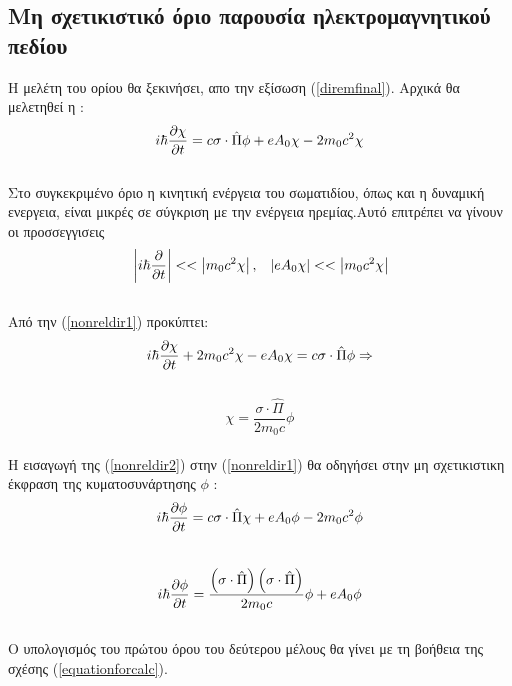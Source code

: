 \subsection{Mη σχετικιστικό όριο παρουσία ηλεκτρομαγνητικού πεδίου}
Η μελέτη του ορίου θα ξεκινήσει, απο την εξίσωση (\ref{diremfinal}). Αρχικά θα μελετηθεί η :\\ 
\begin{equation}
  i\hbar \frac{\partial \chi}{\partial t} = c \sigma \cdot \hat{\Pi} \phi+ e A_0\chi -2m_0 c^2 \chi
  \label{nonreldir1}
\end{equation}\\
Στο συγκεκριμένο όριο η κινητική ενέργεια του σωματιδίου, όπως και η δυναμική ενεργεια, είναι μικρές σε σύγκριση με την ενέργεια ηρεμίας.Αυτό επιτρέπει να γίνουν οι προσσεγγισεις\\ 
\begin{align*}
  &\left| i \hbar \frac{\partial }{\partial t}\right| << \left| m_0 c^2 \chi \right|, &\left| e A_0 \chi \right| << \left| m_0 c^2 \chi \right|
\end{align*}\\
Από την (\ref{nonreldir1}) προκύπτει: \\
\[
  i\hbar \frac{\partial \chi}{\partial t}+2m_0 c^2 \chi- e A_0\chi = c \sigma \cdot \hat{\Pi} \phi \Rightarrow
\]\\
\begin{equation}
  \chi = \frac{\sigma \cdot\hat{\Pi} }{2m_0 c} \phi
  \label{nonreldir2}
\end{equation}\\
Η εισαγωγή της (\ref{nonreldir2}) στην (\ref{nonreldir1}) θα οδηγήσει στην μη σχετικιστικη έκφραση της κυματοσυνάρτησης $\phi$ : \\
\[
 i\hbar \frac{\partial \phi}{\partial t} = c \sigma \cdot \hat{\Pi} \chi+ e A_0\phi -2m_0 c^2 \phi
\]\\
\begin{equation}
  i\hbar \frac{\partial \phi}{\partial t} = \frac{\left(  \sigma \cdot\hat{\Pi} \right)  \left( 
    \sigma \cdot\hat{\Pi} \right)  }{2m_0 c} \phi+ eA_0\phi
  \label{nonreldir3}
\end{equation}\\
Ο υπολογισμός του πρώτου όρου του δεύτερου μέλους θα γίνει με τη βοήθεια της σχέσης (\ref{equationforcalc}).  \\
